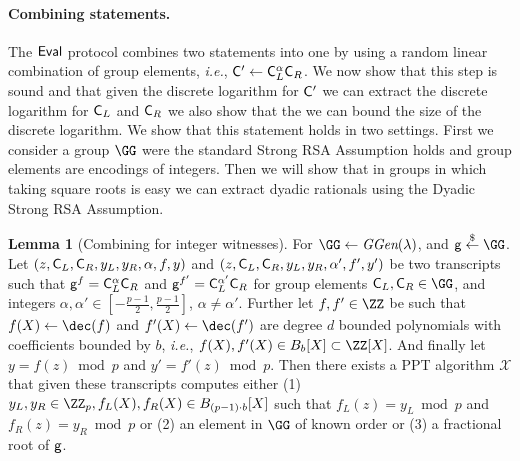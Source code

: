 \documentclass{article}
\theoremstyle{definition}
\newtheorem{lemma}{Lemma}
\begin{document}
\paragraph{Combining statements.} The $\textsf{{Eval}}$ protocol combines two statements into one by using a random linear combination of group elements, \emph{i.e.}, $\mathsf{C}'\gets \mathsf{C}_L^{\alpha}\mathsf{C}_R$. We now show that this step is sound and that given the discrete logarithm for $\mathsf{C}'$ we can extract the discrete logarithm for $\mathsf{C}_L$ and $\mathsf{C}_R$ we also show that the we can bound the size of the discrete logarithm. We show that this statement holds in two settings. First we consider a group $\GG$ were the standard Strong RSA Assumption holds and group elements are encodings of integers. 
Then we will show that in groups in which taking square roots is easy we can extract dyadic rationals using the Dyadic Strong RSA Assumption.
\begin{lemma}[Combining for integer witnesses]
\label{lem:intrandomcombine}
	For $\GG \gets \ggen(\lambda)$, and $\gr{g}\sample \GG$. 
	Let $(z,\mathsf{C}_L,\mathsf{C}_R,y_L,y_R,\alpha,f,y)$ and  $(z,\mathsf{C}_L,\mathsf{C}_R,y_L,y_R,\alpha',f',y')$ be two transcripts such that $\mathsf{g}^{f}=\mathsf{C}_L^{\alpha}\mathsf{C}_R$ and $\mathsf{g}^{f'}=\mathsf{C}_L^{\alpha'}\mathsf{C}_R$ for group elements $\gr{C}_L,\gr{C}_R \in \GG$, and integers $\alpha,\alpha' \in  [-\frac{p-1}{2},\frac{p-1}{2}]$, $\alpha\neq \alpha'$. Further let $f,f'\in \ZZ$ be such that $f(X)\gets\dec(f)$ and $f'(X)\gets\dec(f')$ are degree $d$ bounded polynomials with coefficients bounded by $b$, \emph{i.e.}, $f(X),f'(X)\in B_{b}[X]\subset \ZZ[X]$. And finally let $y=f(z)\bmod p$ and $y'=f'(z)\bmod p$.
	 Then there exists a PPT algorithm $\mathcal{X}$ that given these transcripts computes either (1) $y_L,y_R\in \ZZ_p,f_L(X),f_R(X)\in B_{(p-1) \cdot b}[X]$  such that $f_L(z)=y_L\bmod p$ and $f_R(z)=y_R \bmod p$ or (2) an element in $\GG$ of known order or (3) a fractional root of $\mathsf{g}$.
\end{lemma}
\end{document}

